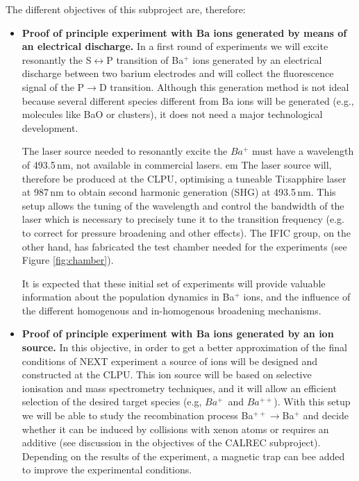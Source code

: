 The different objectives of this subproject are, therefore:

\begin{itemize}
	\item \textbf{Proof of principle experiment with Ba ions generated by means of an electrical discharge.}
In a first round of experiments we will excite resonantly the S$\leftrightarrow$P transition of Ba$^+$ ions generated by an electrical discharge between two barium electrodes and will collect the fluorescence signal of the P$\rightarrow$D transition. Although this generation method is not ideal because several different species different from Ba ions will be generated (e.g., molecules like BaO or clusters), it does not need a major technological development. 

The laser source needed to resonantly excite the $Ba^{+}$ must have a wavelength of 493.5\,nm, not available in commercial lasers. {em The laser source will, therefore be produced at the CLPU}, optimising a tuneable Ti:sapphire laser at 987\,nm to obtain second harmonic generation (SHG) at 493.5\,nm. This setup allows the tuning of the wavelength and control the bandwidth of the laser which is necessary to precisely tune it to the transition frequency (e.g. to correct for pressure broadening and other effects). The IFIC group, on the other hand, has fabricated the test chamber needed for the experiments 
(see Figure \ref{fig:chamber}). 

It is expected that these initial set of experiments will provide valuable information about the population dynamics in Ba$^+$ ions, and the influence of the different homogenous and in-homogenous broadening mechanisms. 
	
	\item \textbf{Proof of principle experiment with Ba ions generated by an ion source.}	
In this objective, in order to get a better approximation of the final conditions of NEXT experiment a source of ions will be designed and constructed at the CLPU. This ion source will be based on selective ionisation and mass spectrometry techniques, and it will allow an efficient selection of the desired target species (e.g, $Ba^{+}$~and $Ba^{++}$). With this setup we will be able to study the recombination process Ba$^{++}\rightarrow$Ba$^{+}$ and decide whether it can be induced by collisions with xenon atoms or requires an additive (see discussion in the objectives of the CALREC subproject). Depending on the results of the experiment, a magnetic trap can bee added to improve the experimental conditions. 
	

\end{itemize}
